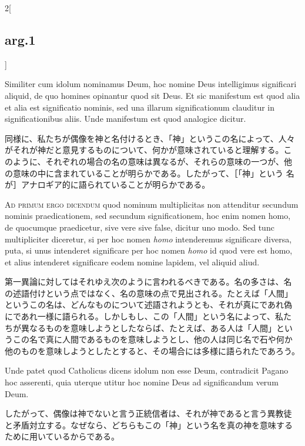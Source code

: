 \documentclass[paper=a4paper,fontsize=10pt,jafontsize=9pt,titlepage]{jlreq}
\begin{document}
\begin{paracol}{2}[\subsection{arg.1}]
\switchcolumn*

Similiter cum idolum nominamus Deum, hoc nomine Deus intelligimus
significari aliquid, de quo homines opinantur quod sit Deus. Et sic
manifestum est quod alia et alia est significatio nominis, sed una
illarum significationum clauditur in significationibus aliis. Unde
manifestum est quod analogice dicitur.

\switchcolumn

同様に、私たちが偶像を神と名付けるとき、「神」というこの名によって、人々
がそれが神だと意見するものについて、何かが意味されていると理解する。こ
のように、それぞれの場合の名の意味は異なるが、それらの意味の一つが、他
の意味の中に含まれていることが明らかである。したがって、［「神」という
名が］アナロギア的に語られていることが明らかである。

\switchcolumn*[\subsection{ad.1}]

{\scshape Ad primum ergo dicendum} quod nominum multiplicitas non
attenditur secundum nominis praedicationem, sed secundum
significationem, hoc enim nomen homo, de quocumque praedicetur, sive
vere sive false, dicitur uno modo. Sed tunc multipliciter diceretur,
si per hoc nomen {\itshape homo} intenderemus significare diversa,
puta, si unus intenderet significare per hoc nomen {\itshape homo} id
quod vere est homo, et alius intenderet significare eodem nomine
lapidem, vel aliquid aliud.

\switchcolumn

第一異論に対してはそれゆえ次のように言われるべきである。名の多さは、名
の述語付けという点ではなく、名の意味の点で見出される。たとえば「人間」
というこの名は、どんなものについて述語されようとも、それが真にであれ偽
にであれ一様に語られる。しかしもし、この「人間」という名によって、私た
ちが異なるものを意味しようとしたならば、たとえば、ある人は「人間」とい
うこの名で真に人間であるものを意味しようとし、他の人は同じ名で石や何か
他のものを意味しようとしたとすると、その場合には多様に語られたであろう。

\switchcolumn*

Unde patet quod Catholicus dicens idolum non esse Deum, contradicit
Pagano hoc asserenti, quia uterque utitur hoc nomine Deus ad
significandum verum Deum.

\switchcolumn

したがって、偶像は神でないと言う正統信者は、それが神であると言う異教徒
と矛盾対立する。なぜなら、どちらもこの「神」という名を真の神を意味する
ために用いているからである。


\end{paracol}
\end{document}
